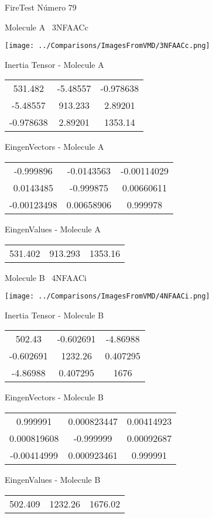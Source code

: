 \vtab[-3cm]
\begin{center}
{\large FireTest \tab Número 79}
\end{center}
\begin{multicols}{2}
\begin{center}

Molecule A \
3NFAACc

\texttt{[image: ../Comparisons/ImagesFromVMD/3NFAACc.png]}

Inertia Tensor - Molecule A \\
\begin{tabular}{|c c c|}
531.482	 & 	-5.48557	 & 	-0.978638	 \\
-5.48557	 & 	913.233	 & 	2.89201	 \\
-0.978638	 & 	2.89201	 & 	1353.14
\end{tabular}

\vtab
 EingenVectors - Molecule A     \\
\begin{tabular}{|c c c|}
-0.999896	 & 	-0.0143563	 & 	-0.00114029	 \\
0.0143485	 & 	-0.999875	 & 	0.00660611	 \\
-0.00123498	 & 	0.00658906	 & 	0.999978
\end{tabular}

\vtab
 EingenValues - Molecule A     \\
\begin{tabular}{|c c c|}
531.402	 & 	913.293	 & 	1353.16	 \\
\end{tabular}
\columnbreak

Molecule B \
4NFAACi

\texttt{[image: ../Comparisons/ImagesFromVMD/4NFAACi.png]}

Inertia Tensor - Molecule B \\
\begin{tabular}{|c c c|}
502.43	 & 	-0.602691	 & 	-4.86988	 \\
-0.602691	 & 	1232.26	 & 	0.407295	 \\
-4.86988	 & 	0.407295	 & 	1676
\end{tabular}

\vtab
 EingenVectors - Molecule B     \\
\begin{tabular}{|c c c|}
0.999991	 & 	0.000823447	 & 	0.00414923	 \\
0.000819608	 & 	-0.999999	 & 	0.00092687	 \\
-0.00414999	 & 	0.000923461	 & 	0.999991
\end{tabular}

\vtab
 EingenValues - Molecule B     \\
\begin{tabular}{|c c c|}
502.409	 & 	1232.26	 & 	1676.02	 \\
\end{tabular}

\end{center}
\end{multicols}

